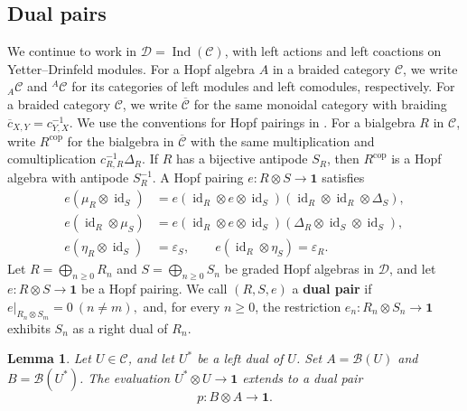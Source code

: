 \documentclass[11pt, a4paper]{article}
\numberwithin{equation}{section}
\newcommand{\C}{\mathcal C}
\newcommand{\D}{\mathcal D}
\newcommand{\B}{\mathcal B}
\newcommand{\one}{\mathbf 1}
\DeclareMathOperator{\id}{id}
\DeclareMathOperator{\Ind}{Ind}
\newtheorem{lemma}[theorem]{Lemma}
\begin{document}
\subsection{Dual pairs}
We continue to work in $\D=\Ind(\C)$, with left actions and left
coactions on Yetter--Drinfeld modules.
For a Hopf algebra $A$ in a braided category $\mathcal C$, we write
${}_A\mathcal C$ and ${}^A\mathcal C$ for its categories of left
modules and left comodules, respectively.
For a braided category $\mathcal C$,
we write $\overline{\mathcal C}$ for the same monoidal category with
braiding $\overline c_{X,Y}=c_{Y,X}^{-1}$. We use the conventions for
Hopf pairings  in \cite[Section~2]{Simon}.
For a bialgebra $R$ in $\mathcal C$, write $R^{\mathrm{cop}}$
for the bialgebra in $\overline{\mathcal C}$ with the same
multiplication and comultiplication $c_{R,R}^{-1}\Delta_R$.
If $R$ has a bijective antipode $S_R$, then $R^{\mathrm{cop}}$
is a Hopf algebra with antipode $S_R^{-1}$.
A Hopf pairing $e:R\otimes S\to\one$ satisfies
\begin{align}
 e(\mu_R\otimes\id_S)
 &=e(\id_R\otimes e\otimes\id_S)
       (\id_R\otimes\id_R\otimes\Delta_S),\label{dual:pairing-first}\\
 e(\id_R\otimes\mu_S)
 &=e(\id_R\otimes e\otimes\id_S)
       (\Delta_R\otimes\id_S\otimes\id_S),\label{dual:pairing-second}\\
 e(\eta_R\otimes\id_S)&=\varepsilon_S,
 \qquad e(\id_R\otimes\eta_S)=\varepsilon_R.\nonumber
\end{align}
Let $R=\bigoplus_{n\geq0}R_n$ and
$S=\bigoplus_{n\geq0}S_n$ be graded Hopf algebras in $\D$,
and let $e:R\otimes S\to\one$ be a Hopf pairing.
We call $(R,S,e)$ a \textbf{dual pair} if
$
 e|_{R_n\otimes S_m}=0 \ (n\ne m),
$
and, for every $n\geq0$, the restriction
$
 e_n:R_n\otimes S_n\longrightarrow\one
$
exhibits $S_n$ as a right dual of $R_n$.


\begin{lemma}\label{dual:pairing}
Let $U\in\C$, and let $U^*$ be a left dual of $U$. Set
$A=\B(U)$ and $B=\B(U^*)$. The evaluation
$U^*\otimes U\to\one$ extends to a dual pair
\[
 p:B\otimes A\longrightarrow\one.
\]
\end{lemma}
\end{document}

